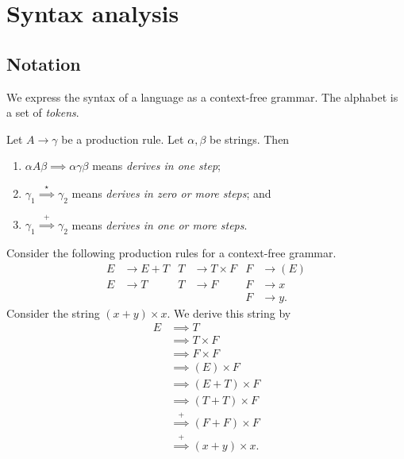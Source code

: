 \chapter{Syntax analysis}
\section{Notation}

We express the syntax of a language as a context-free grammar.
The alphabet is a set of \emph{tokens}.

Let $A \to \gamma$ be a production rule. 
Let $\alpha, \beta$ be strings.
Then
\begin{enumerate}
    \item $\alpha A \beta \implies \alpha \gamma \beta$
        means \emph{derives in one step};
    \item $\gamma_1 \overset\star\implies \gamma_2$
        means \emph{derives in zero or more steps}; and
    \item $\gamma_1 \overset{+}\implies \gamma_2$
        means \emph{derives in one or more steps}.
\end{enumerate}

\begin{example}
    Consider the following production rules for a context-free grammar.
    \begin{align*}
        E &\to E + T & T &\to T \times F & F &\to (E) \\
        E &\to T     & T &\to F          & F &\to x   \\
          &          &   &               & F &\to y.
    \end{align*}
    Consider the string $(x + y) \times x$.
    We derive this string by
    \begin{align*}
        E
        &\implies            T                \\
        &\implies            T \times F       \\
        &\implies            F \times F       \\
        &\implies            (E) \times F     \\
        &\implies            (E + T) \times F \\
        &\implies            (T + T) \times F \\
        &\overset{+}\implies (F + F) \times F \\
        &\overset{+}\implies (x + y) \times x.
    \end{align*}
\end{example}

